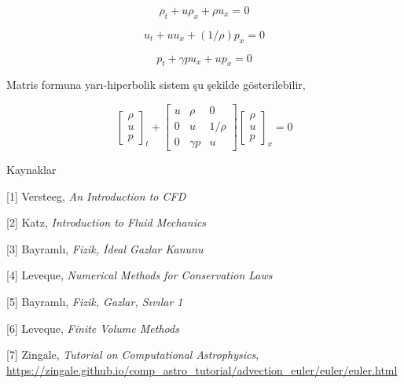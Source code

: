 \documentclass[12pt,fleqn]{article}\usepackage{../../common}
\begin{document}
$$
\rho_t + u \rho_x + \rho u_x = 0
$$

$$
u_t + uu_x + (1/\rho) p_x = 0
$$

$$
p_t + \gamma p u_x + u p_x = 0
$$

Matris formuna yarı-hiperbolik sistem şu şekilde gösterilebilir,

$$
\left[\begin{array}{c}
\rho \\ u \\ p
\end{array}\right]_t +
\left[\begin{array}{ccc}
u & \rho & 0 \\
0 & u & 1/\rho \\
0 & \gamma p & u
\end{array}\right]
\left[\begin{array}{c}
\rho \\ u \\ p
\end{array}\right]_x
= 0
$$

Kaynaklar

[1] Versteeg, {\em An Introduction to CFD}

[2] Katz, {\em Introduction to Fluid Mechanics}

[3] Bayramlı, {\em Fizik, İdeal Gazlar Kanunu}

[4] Leveque, {\em Numerical Methods for Conservation Laws}

[5] Bayramlı, {\em Fizik, Gazlar, Sıvılar 1}

[6] Leveque, {\em Finite Volume Methods}

[7] Zingale, {\em Tutorial on Computational Astrophysics},
    \url{https://zingale.github.io/comp_astro_tutorial/advection_euler/euler/euler.html}
\end{document}
